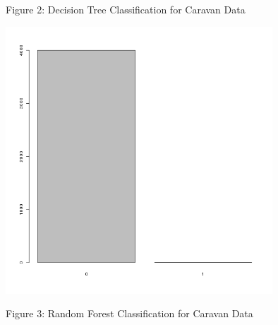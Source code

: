 \documentclass[a4paper,10pt]{article}
\begin{document}
Figure 2: Decision Tree Classification for Caravan Data


\includegraphics[width=100mm]{vs_blind.png}

Figure 3: Random Forest Classification for Caravan Data
\end{document}
